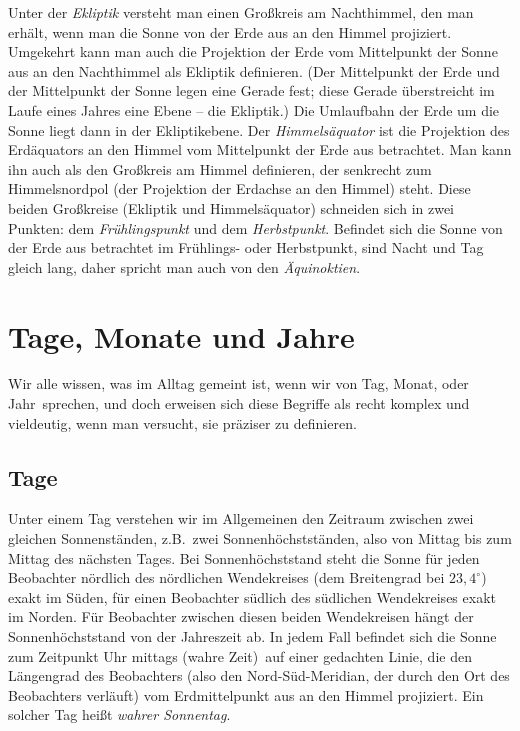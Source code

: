 Unter der \textit{Ekliptik} 
versteht man einen Gro\ss kreis am Nachthimmel, den man erh\"alt,
wenn man die Sonne von der Erde aus an den Himmel projiziert. Umgekehrt kann man auch
die Projektion der Erde vom Mittelpunkt der Sonne aus an den Nachthimmel als Ekliptik 
definieren. (Der Mittelpunkt der Erde und der Mittelpunkt der Sonne legen eine Gerade
fest; diese Gerade \"uberstreicht im Laufe eines Jahres eine Ebene -- die Ekliptik.)
Die Umlaufbahn der Erde um die Sonne liegt dann in der Ekliptikebene.
Der \textit{Himmels\"aquator} ist die Projektion des Erd\"aquators an den Himmel vom Mittelpunkt 
der Erde aus betrachtet.
Man kann ihn auch als den Gro\ss kreis am Himmel definieren, der senkrecht zum
Himmelsnordpol (der Projektion der Erdachse an den Himmel) steht. Diese beiden
Gro\ss kreise (Ekliptik und Himmels\"aquator) schneiden sich in zwei Punkten:
dem \textit{Fr\"uhlingspunkt}
und dem \textit{Herbstpunkt}.
Befindet sich die Sonne von der Erde aus betrachtet im Fr\"uhlings- oder Herbstpunkt, sind Nacht und Tag
gleich lang, daher spricht man auch von den \textit{\"Aquinoktien}.

\section{Tage, Monate und Jahre}

Wir alle wissen, was im Alltag gemeint ist, wenn wir von \glqq Tag\grqq,  \glqq Monat\grqq, oder
\glqq Jahr\grqq\ sprechen, und doch erweisen sich diese Begriffe als recht komplex und vieldeutig,
wenn man versucht, sie pr\"aziser zu definieren. 

\subsection{Tage}

Unter einem Tag 
verstehen wir im Allgemeinen den Zeitraum zwischen zwei gleichen 
Sonnenst\"anden, z.B.\ zwei Sonnenh\"ochstst\"anden,
also von Mittag bis zum Mittag des n\"achsten Tages. Bei Sonnenh\"ochststand steht die Sonne
f\"ur jeden Beobachter n\"ordlich des n\"ordlichen Wendekreises (dem Breitengrad bei $23,4^\circ$)
exakt im S\"uden, f\"ur einen Beobachter s\"udlich des s\"udlichen Wendekreises exakt im Norden.
F\"ur Beobachter zwischen diesen beiden Wendekreisen h\"angt der Sonnenh\"ochststand von der
Jahreszeit ab. In jedem Fall befindet sich die Sonne zum Zeitpunkt  Uhr mittags (wahre Zeit)\grqq\
auf einer gedachten Linie, die den L\"angengrad des Beobachters
(also den Nord-S\"ud-Meridian, der durch den Ort des Beobachters verl\"auft) vom Erdmittelpunkt
aus an den Himmel projiziert. Ein solcher Tag hei\ss t \textit{wahrer Sonnentag}. 


